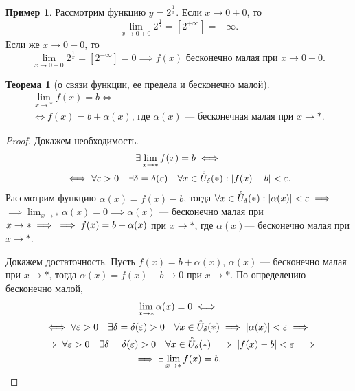 \documentclass[a4paper,12pt]{article} %
\newtheorem{theorem}{Теорема}[section]
\theoremstyle{remark}
\theoremstyle{definition}
\newtheorem{exmp}{Пример}[section]
\begin{document}
  \begin{exmp}
  Рассмотрим функцию $y = 2^{\frac{1}{x}}$. Если $x\to 0+0$, то
  \[ \lim_{x \to 0+0} 2^{\frac{1}{x}} = [2^{+\infty}] = +\infty .\]
  Если же $x\to 0-0$, то
  \[ \lim_{x \to 0-0} 2^{\frac{1}{x}} = [2^{-\infty}] = 0 \implies f(x) \text{ бесконечно малая при } x \to 0-0 .\]
  \end{exmp}
  
  \begin{theorem}[о связи функции, ее предела и бесконечно малой]
  \begin{multline}
  \lim_{x \to *} f(x) = b \iff \\
  \iff f(x) = b + \alpha(x) \text{, где }\alpha(x) \text{ --- бесконечная малая при }x\to *.
  \end{multline}
  \end{theorem}
  \begin{proof}
    Докажем необходимость.
    \begin{multline}
      \exists \lim_{x \to *} f(x) = b \iff \\
      \iff \forall \varepsilon>0 \quad \exists \delta=\delta(\varepsilon) \quad \forall x\in \accentset{\circ}{U}_\delta(*) : |f(x) - b| < \varepsilon.
    \end{multline}
    Рассмотрим функцию $\alpha(x)=f(x)-b$, тогда $\forall x\in \accentset{\circ}{U}_\delta(*) : |\alpha(x)|<\varepsilon
    \implies$ \\ $\displaystyle \implies \lim_{x \to *} \alpha(x) = 0 \implies \alpha(x)$ --- бесконечно малая при 
    $x\to * \implies \\ \implies f(x) = b + \alpha(x)$ при $x\to *$, где $\alpha (x)$--- бесконечно малая при $x\to *$.
    
    Докажем достаточность. Пусть $f(x) = b + \alpha(x)$,  $\alpha(x)$ --- бесконечно малая при  $x \to  * $,
    тогда $\alpha(x) = f(x) - b \to  0 \text{ при } x\to *$. По определению бесконечно малой,
    \begin{multline}
      \lim_{x \to *} \alpha(x) = 0 \iff \\
      \iff \forall  \varepsilon>0 \quad \exists \delta=\delta(\varepsilon) > 0 \quad \forall x \in \accentset{\circ}{U}_\delta(*) \implies |\alpha(x)| < \varepsilon \implies \\
      \implies \forall  \varepsilon>0 \quad \exists \delta=\delta(\varepsilon) > 0 \quad \forall x \in \accentset{\circ}{U}_\delta(*) \implies |f(x)-b| < \varepsilon \implies \\
      \implies \exists \lim_{x \to *} f(x) = b.
    \end{multline}
  \end{proof}
\end{document}
